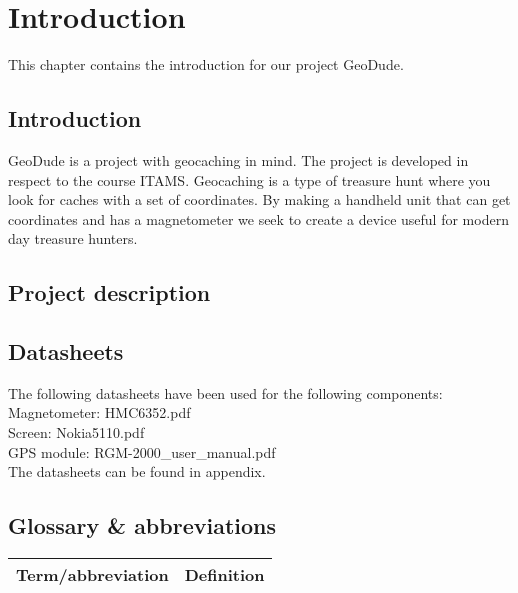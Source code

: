 \chapter{Introduction}
This chapter contains the introduction for our project GeoDude.


\section{Introduction}
GeoDude is a project with geocaching in mind. The project is developed in respect to the course ITAMS. Geocaching is a type of treasure hunt where you look for caches with a set of coordinates. By making a handheld unit that can get coordinates and has a magnetometer we seek to create a device useful for modern day treasure hunters. 

\section{Project description}

\section{Datasheets}
The following datasheets have been used for the following components:\\
Magnetometer: HMC6352.pdf\\
Screen: Nokia5110.pdf\\
GPS module: RGM-2000\_user\_manual.pdf\\

The datasheets can be found in appendix.

\section{Glossary \& abbreviations}
\begin{table}[H]
\centering
\begin{tabular}{|p{4cm}|p{7cm}|}
\hline
Term/abbreviation & Definition\\ \hline
\end{tabular}
\end{table}

